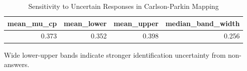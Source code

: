\begin{table}[!htbp]
\centering
\caption{Sensitivity to Uncertain Responses in Carlson-Parkin Mapping}
\label{tab:cp_bounds}
\begin{threeparttable}

\begin{tabular}{rrrr}
\toprule
mean\_mu\_cp & mean\_lower & mean\_upper & median\_band\_width\\
\midrule
0.373 & 0.352 & 0.398 & 0.256\\
\bottomrule
\end{tabular}
\begin{tablenotes}[flushleft]
\footnotesize
\item Wide lower-upper bands indicate stronger identification uncertainty from non-answers.
\end{tablenotes}
\end{threeparttable}
\end{table}
